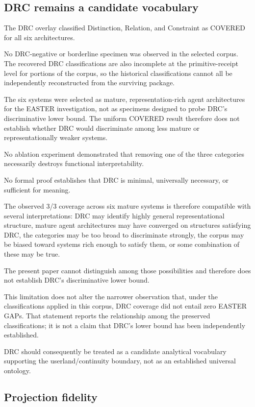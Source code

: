 \documentclass[11pt]{article}
\begin{document}
\subsection{DRC remains a candidate vocabulary}

The DRC overlay classified Distinction, Relation, and Constraint as COVERED for all six architectures.

No DRC-negative or borderline specimen was observed in the selected corpus. The recovered DRC classifications are also incomplete at the primitive-receipt level for portions of the corpus, so the historical classifications cannot all be independently reconstructed from the surviving package.

The six systems were selected as mature, representation-rich agent architectures for the EASTER investigation, not as specimens designed to probe DRC's discriminative lower bound. The uniform COVERED result therefore does not establish whether DRC would discriminate among less mature or representationally weaker systems.

No ablation experiment demonstrated that removing one of the three categories necessarily destroys functional interpretability.

No formal proof establishes that DRC is minimal, universally necessary, or sufficient for meaning.

The observed 3/3 coverage across six mature systems is therefore compatible with several interpretations: DRC may identify highly general representational structure, mature agent architectures may have converged on structures satisfying DRC, the categories may be too broad to discriminate strongly, the corpus may be biased toward systems rich enough to satisfy them, or some combination of these may be true.

The present paper cannot distinguish among those possibilities and therefore does not establish DRC's discriminative lower bound.

This limitation does not alter the narrower observation that, under the classifications applied in this corpus, DRC coverage did not entail zero EASTER GAPs. That statement reports the relationship among the preserved classifications; it is not a claim that DRC's lower bound has been independently established.

DRC should consequently be treated as a candidate analytical vocabulary supporting the userland/continuity boundary, not as an established universal ontology.

\subsection{Projection fidelity}
\end{document}
